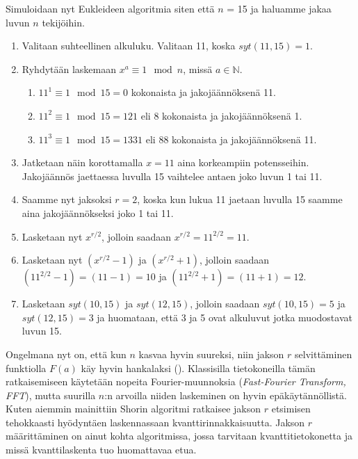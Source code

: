 Simuloidaan nyt Eukleideen algoritmia siten että $n$ = 15 ja haluamme jakaa luvun $n$ tekijöihin.
\begin{enumerate}
    \item Valitaan suhteellinen alkuluku. Valitaan 11, koska $syt(11,15) = 1$.
    
    \item Ryhdytään laskemaan $x^{a} \equiv 1 \mod n$, missä $a \in \mathbb{N}$.
    
    \begin{enumerate}
    
        \item $11^{1} \equiv 1 \mod 15 = 0$ kokonaista ja jakojäännöksenä 11.
        
        \item $11^{2} \equiv 1 \mod 15 = 121$ eli 8 kokonaista ja jakojäännöksenä 1.
        
        \item $11^{3} \equiv 1 \mod 15 = 1331$ eli 88 kokonaista ja jakojäännöksenä 11.
    \end{enumerate}
    
    \item Jatketaan näin korottamalla $x = 11$ aina korkeampiin potensseihin. Jakojäännös jaettaessa luvulla 15 vaihtelee antaen joko luvun 1 tai 11.
    
    \item Saamme nyt jaksoksi $r = 2$, koska kun lukua 11 jaetaan luvulla 15 saamme aina jakojäännökseksi joko 1 tai 11.
    
    \item Lasketaan nyt $x^{r/2}$, jolloin saadaan $x^{r/2} = 11^{2/2} = 11$.
    
    \item Lasketaan nyt $(x^{r/2}-1)$ ja $(x^{r/2}+1)$, jolloin saadaan $(11^{2/2} - 1) = (11 - 1) = 10$ ja $(11^{2/2} + 1) = (11 + 1) = 12$.
    
    \item Lasketaan $syt(10,15)$ ja $syt(12,15)$, jolloin saadaan $syt(10,15) = 5$ ja $syt(12,15) = 3$ ja huomataan, että 3 ja 5 ovat alkuluvut jotka muodostavat luvun 15.
    
\end{enumerate}

Ongelmana nyt on, että kun $n$ kasvaa hyvin suureksi, niin jakson $r$ selvittäminen funktiolla $F(a)$ käy hyvin hankalaksi (\cite{doi:10.1080/23742917.2016.1226650}). Klassisilla tietokoneilla tämän ratkaisemiseen käytetään nopeita Fourier-muunnoksia (\emph{Fast-Fourier Transform, FFT}), mutta suurilla $n$:n arvoilla niiden laskeminen on hyvin epäkäytännöllistä. Kuten aiemmin mainittiin Shorin algoritmi ratkaisee jakson $r$ etsimisen tehokkaasti hyödyntäen laskennassaan kvanttirinnakkaisuutta. Jakson $r$ määrittäminen on ainut kohta algoritmissa, jossa tarvitaan kvanttitietokonetta ja missä kvanttilaskenta tuo huomattavaa etua.

